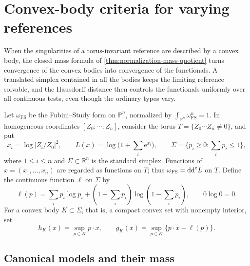 \section{Convex-body criteria for varying references}
\label{sec:convex-body-reference-stability}

When the singularities of a torus-invariant reference are described by a convex body, the closed mass formula of \cref{thm:normalization-mass-quotient} turns convergence of the convex bodies into convergence of the functionals. A translated simplex contained in all the bodies keeps the limiting reference solvable, and the Hausdorff distance then controls the functionals uniformly over all continuous tests, even though the ordinary types vary.

Let $\omega_{\mathrm{FS}}$ be the Fubini--Study form on $\mathbb P^n$, normalized by $\int_{\mathbb P^n}\omega_{\mathrm{FS}}^n=1$. In homogeneous coordinates $[Z_0:\cdots:Z_n]$, consider the torus $T=\{Z_0\cdots Z_n\ne0\}$, and put
\[
 x_i=\log|Z_i/Z_0|^2,\qquad
 L(x)=\log\bigl(1+\textstyle\sum_i\mathrm{e}^{x_i}\bigr),\qquad
 \Sigma=\{p_i\geq0:\textstyle\sum_i p_i\leq1\},
\]
where $1\leq i\leq n$ and $\Sigma\subset\mathbb R^n$ is the standard simplex. Functions of $x=(x_1,\ldots,x_n)$ are regarded as functions on $T$; thus $\omega_{\mathrm{FS}}=\mathrm{dd}^{\mathrm{c}} L$ on $T$. Define the continuous function $\ell$ on $\Sigma$ by
\[
 \ell(p)=\sum_i p_i\log p_i+
       (1-\textstyle\sum_i p_i)\log(1-\textstyle\sum_i p_i),
 \qquad 0\log0=0.
\]
For a convex body $K\subset\Sigma$, that is, a compact convex set with nonempty interior, set
\[
 h_K(x)=\sup_{p\in K}p\cdot x,\qquad
 g_K(x)=\sup_{p\in K}\{p\cdot x-\ell(p)\}.
\]

\subsection{Canonical models and their mass}

